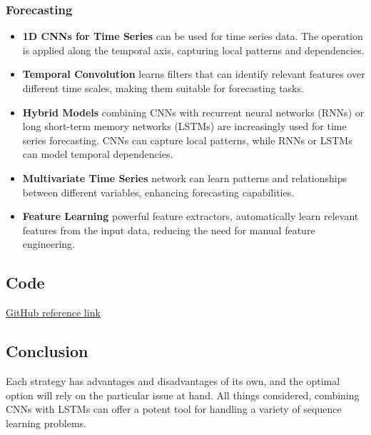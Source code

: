 \documentclass{article}
\begin{document}
\subsubsection{Forecasting}
\begin{itemize}
    \item \textbf{1D CNNs for Time Series} can be used for time series data. The operation is applied along the temporal axis, capturing local patterns and dependencies.
    \item \textbf{Temporal Convolution} learns filters that can identify relevant features over different time scales, making them suitable for forecasting tasks.
    \item \textbf{Hybrid Models} combining CNNs with recurrent neural networks (RNNs) or long short-term memory networks (LSTMs) are increasingly used for time series forecasting. CNNs can capture local patterns, while RNNs or LSTMs can model temporal dependencies.\cite{r4}
    \item \textbf{Multivariate Time Series} network can learn patterns and relationships between different variables, enhancing forecasting capabilities.
    \item \textbf{Feature Learning} powerful feature extractors, automatically learn relevant features from the input data, reducing the need for manual feature engineering.
\end{itemize}

\subsection{Code}
\href{https://github.com/mijanr/TimeSeries/blob/master/Time_Series_Classification/cnn_plus_lstm.ipynb}{GitHub reference link}

\subsection{Conclusion}
Each strategy has advantages and disadvantages of its own, and the optimal option will rely on the particular issue at hand. All things considered, combining CNNs with LSTMs can offer a potent tool for handling a variety of sequence learning problems.



\end{document}
